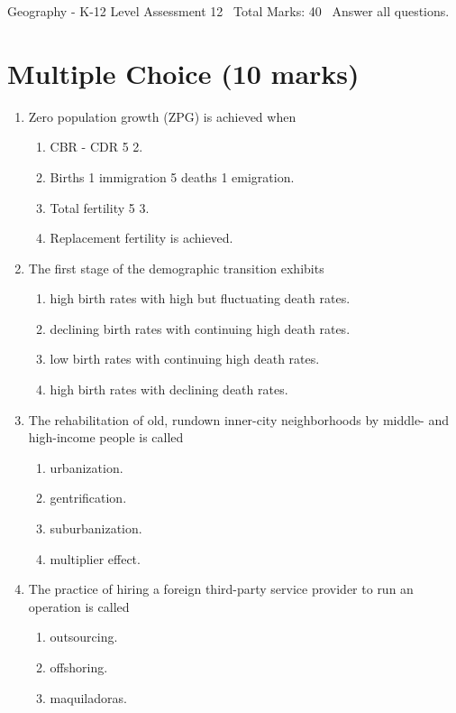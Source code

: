 \documentclass[12pt]{article}
\begin{document}
\begin{center}
Geography - K-12 Level Assessment 12 \
Total Marks: 40 \
Answer all questions.
\end{center}

\section*{Multiple Choice (10 marks)}
\begin{enumerate}[label=\arabic*.]
\item Zero population growth (ZPG) is achieved when
\begin{enumerate}[label=(\alph*)]
    \item CBR - CDR 5 2.
    \item Births 1 immigration 5 deaths 1 emigration.
    \item Total fertility 5 3.
    \item Replacement fertility is achieved.
\end{enumerate}
\item The first stage of the demographic transition exhibits
\begin{enumerate}[label=(\alph*)]
    \item high birth rates with high but fluctuating death rates.
    \item declining birth rates with continuing high death rates.
    \item low birth rates with continuing high death rates.
    \item high birth rates with declining death rates.
\end{enumerate}
\item The rehabilitation of old, rundown inner-city neighborhoods by middle- and high-income people is called
\begin{enumerate}[label=(\alph*)]
    \item urbanization.
    \item gentrification.
    \item suburbanization.
    \item multiplier effect.
\end{enumerate}
\item The practice of hiring a foreign third-party service provider to run an operation is called
\begin{enumerate}[label=(\alph*)]
    \item outsourcing.
    \item offshoring.
    \item maquiladoras.

\end{enumerate}
\end{enumerate}
\end{document}
